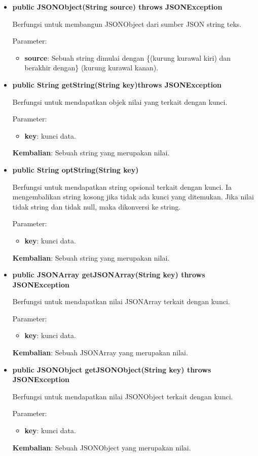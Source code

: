 \begin{itemize}
	
	\item \textbf{public JSONObject(String source) throws JSONException}
	
	Berfungsi untuk membangun JSONObject dari sumber JSON string teks.
	
	Parameter:
	\begin{itemize}
		\item \textbf{source}: Sebuah string dimulai dengan \{(kurung kurawal kiri) dan berakhir dengan\} (kurung kurawal kanan).
	\end{itemize}
	
	\item \textbf{public String getString(String key)throws JSONException}
	
	Berfungsi untuk mendapatkan objek nilai yang terkait dengan kunci.
	
	Parameter:
	\begin{itemize}
		\item \textbf{key}: kunci data.
	\end{itemize}
	\textbf{Kembalian}: Sebuah string yang merupakan nilai.
	
	\item \textbf{public String optString(String key)}
	
	Berfungsi untuk mendapatkan string opsional terkait dengan kunci. Ia mengembalikan string kosong jika tidak ada kunci yang ditemukan. Jika nilai tidak string dan tidak null, maka dikonversi ke string.
	
	Parameter:
	\begin{itemize}
		\item \textbf{key}: kunci data.
	\end{itemize}
	\textbf{Kembalian}: Sebuah string yang merupakan nilai.
	
	\item \textbf{public JSONArray getJSONArray(String key) throws JSONException}
	
	Berfungsi untuk mendapatkan nilai JSONArray terkait dengan kunci.
	
	Parameter:
	\begin{itemize}
		\item \textbf{key}: kunci data.
	\end{itemize}
	\textbf{Kembalian}: Sebuah JSONArray yang merupakan nilai.
	
	\item \textbf{public JSONObject getJSONObject(String key) throws JSONException}
	
	Berfungsi untuk mendapatkan nilai JSONObject terkait dengan kunci.
	
	Parameter:
	\begin{itemize}
		\item \textbf{key}: kunci data.
	\end{itemize}
	\textbf{Kembalian}: Sebuah JSONObject yang merupakan nilai.
\end{itemize}